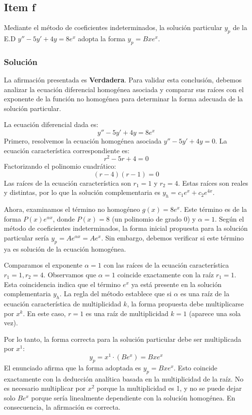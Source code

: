 \documentclass[a4paper]{article}
\begin{document}
\subsection{Item f}
Mediante el método de coeficientes indeterminados, la solución particular $y_p$ de la E.D $y'' - 5y' + 4y = 8e^x$ adopta la forma $y_p = Bxe^x$.

\subsubsection{Solución}
La afirmación presentada es \textbf{Verdadera}. Para validar esta conclusión, debemos analizar la ecuación diferencial homogénea asociada y comparar sus raíces con el exponente de la función no homogénea para determinar la forma adecuada de la solución particular.

La ecuación diferencial dada es:
$$
y'' - 5y' + 4y = 8e^x
$$
Primero, resolvemos la ecuación homogénea asociada $y'' - 5y' + 4y = 0$. La ecuación característica correspondiente es:
$$
r^2 - 5r + 4 = 0
$$
Factorizando el polinomio cuadrático:
$$
(r - 4)(r - 1) = 0
$$
Las raíces de la ecuación característica son $r_1 = 1$ y $r_2 = 4$. Estas raíces son reales y distintas, por lo que la solución complementaria es $y_h = c_1 e^x + c_2 e^{4x}$.

Ahora, examinamos el término no homogéneo $g(x) = 8e^x$. Este término es de la forma $P(x)e^{\alpha x}$, donde $P(x) = 8$ (un polinomio de grado 0) y $\alpha = 1$.
Según el método de coeficientes indeterminados, la forma inicial propuesta para la solución particular sería $y_p = A e^{\alpha x} = A e^x$. Sin embargo, debemos verificar si este término ya es solución de la ecuación homogénea.

Comparamos el exponente $\alpha = 1$ con las raíces de la ecuación característica $r_1 = 1, r_2 = 4$. Observamos que $\alpha = 1$ coincide exactamente con la raíz $r_1 = 1$. Esta coincidencia indica que el término $e^x$ ya está presente en la solución complementaria $y_h$.
La regla del método establece que si $\alpha$ es una raíz de la ecuación característica de multiplicidad $k$, la forma propuesta debe multiplicarse por $x^k$. En este caso, $r = 1$ es una raíz de multiplicidad $k = 1$ (aparece una sola vez).

Por lo tanto, la forma correcta para la solución particular debe ser multiplicada por $x^1$:
$$
y_p = x^1 \cdot (B e^x) = Bxe^x
$$
El enunciado afirma que la forma adoptada es $y_p = Bxe^x$. Esto coincide exactamente con la deducción analítica basada en la multiplicidad de la raíz. No es necesario multiplicar por $x^2$ porque la multiplicidad es 1, y no se puede dejar solo $Be^x$ porque sería linealmente dependiente con la solución homogénea. En consecuencia, la afirmación es correcta.
\end{document}
